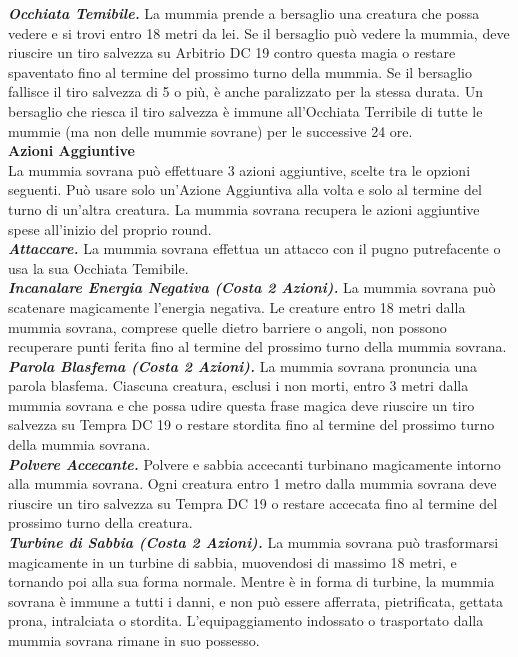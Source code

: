 \begin{multicols}{2}
\emph{\textbf{Occhiata Temibile.}} La mummia prende a bersaglio una creatura che possa vedere e si trovi entro 18 metri da lei. Se il bersaglio può vedere la mummia, deve riuscire un tiro salvezza su Arbitrio DC  19 contro questa magia o restare spaventato fino al termine del prossimo turno della mummia. Se il bersaglio fallisce il tiro salvezza di 5 o più, è anche paralizzato per la stessa durata. Un bersaglio che riesca il tiro salvezza è immune all'Occhiata Terribile di tutte le mummie (ma non delle mummie sovrane) per le successive 24 ore.\\

\textbf{Azioni Aggiuntive}\\

La mummia sovrana può effettuare 3 azioni aggiuntive, scelte tra le opzioni seguenti. Può usare solo un'Azione Aggiuntiva alla volta e solo al termine del turno di un'altra creatura. La mummia sovrana recupera le azioni aggiuntive spese all'inizio del proprio round.\\

\emph{\textbf{Attaccare.}} La mummia sovrana effettua un attacco con il pugno putrefacente o usa la sua Occhiata Temibile.\\

\emph{\textbf{Incanalare Energia Negativa (Costa 2 Azioni).}} La mummia sovrana può scatenare magicamente l'energia negativa. Le creature entro 18 metri dalla mummia sovrana, comprese quelle dietro barriere o angoli, non possono recuperare punti ferita fino al termine del prossimo turno della mummia sovrana.\\

\emph{\textbf{Parola Blasfema (Costa 2 Azioni).}} La mummia sovrana pronuncia una parola blasfema. Ciascuna creatura, esclusi i non morti, entro 3 metri dalla mummia sovrana e che possa udire questa frase magica deve riuscire un tiro salvezza su Tempra DC  19 o restare stordita fino al termine del prossimo turno della mummia sovrana.\\

\emph{\textbf{Polvere Accecante.}} Polvere e sabbia accecanti turbinano magicamente intorno alla mummia sovrana. Ogni creatura entro 1 metro dalla mummia sovrana deve riuscire un tiro salvezza su Tempra DC  19 o restare accecata fino al termine del prossimo turno della creatura.\\

\emph{\textbf{Turbine di Sabbia (Costa 2 Azioni).}} La mummia sovrana può trasformarsi magicamente in un turbine di sabbia, muovendosi di massimo 18 metri, e tornando poi alla sua forma normale. Mentre è in forma di turbine, la mummia sovrana è immune a tutti i danni, e non può essere afferrata, pietrificata, gettata prona, intralciata o stordita. L'equipaggiamento indossato o trasportato dalla mummia sovrana rimane in suo possesso.\\


\end{multicols}
